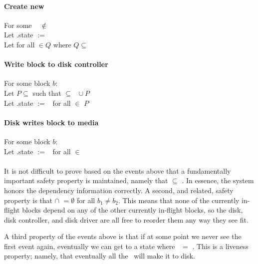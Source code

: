 \paragraph{Create new \chdesc}
For some \chdesc\  $\not\in$ \ChAll\: \\
Let .state $:=$ \statenone \\
Let  for all  $\in Q$ where $Q \subseteq$ \ChAll %

\paragraph{Write block to disk controller}
For some block $b$: \\
Let $P \subseteq$  such that  $\subseteq$ \ChDisk\ $\cup\ P$ \\
Let .state $:=$ \stateinf\ for all  $\in$ $P$

\paragraph{Disk writes block to media}
For some block $b$: \\
Let .state $:=$ \statedisk\ for all  $\in$ 

\paragraph{} It is not difficult to prove based on the events above that a
fundamentally important safety property is maintained, namely that
\BeforeS{\ChDisk} $\subseteq$ \ChDisk. In essence, the system honors the
dependency information correctly. A second, and related, safety property is that
 $\cap$  $= \emptyset$ for all $b_1 \neq b_2$.
This means that none of the currently in-flight blocks depend on any of the
other currently in-flight blocks, so the disk, disk controller, and disk driver
are all free to reorder them any way they see fit.

A third property of the events above is that if at some point we never see the
first event again, eventually we can get to a state where \ChDisk\ $=$ \ChAll.
This is a liveness property; namely, that eventually all the \chdescs\ will make
it to disk.

